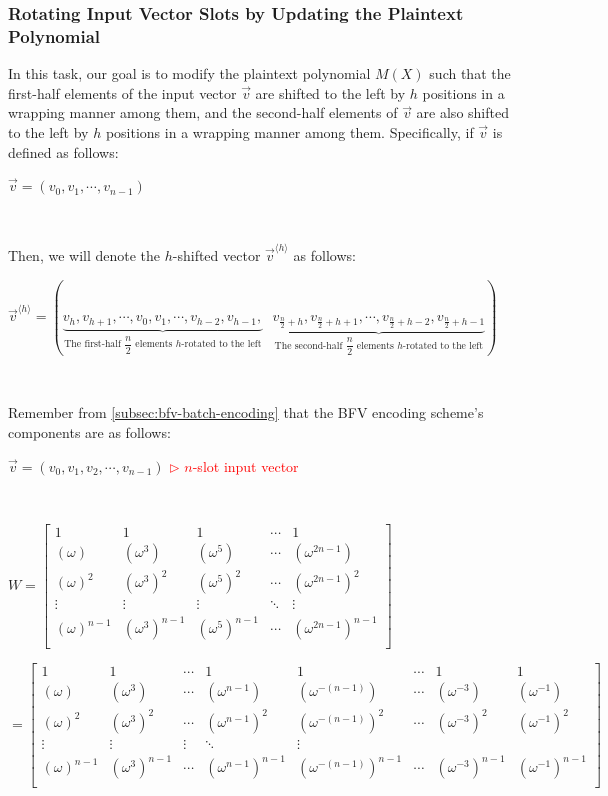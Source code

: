 \subsubsection{Rotating Input Vector Slots by Updating the Plaintext Polynomial}

In this task, our goal is to modify the plaintext polynomial $M(X)$ such that the first-half elements of the input vector $\vec{v}$ are shifted to the left by $h$ positions in a wrapping manner among them, and the second-half elements of $\vec{v}$ are also shifted to the left by $h$ positions in a wrapping manner among them. Specifically, if $\vec{v}$ is defined as follows:

$\vec{v} = (v_0, v_1, \cdots, v_{n-1})$

$ $

Then, we will denote the $h$-shifted vector $\vec{v}^{\langle h \rangle}$ as follows:  

$\vec{v}^{\langle h \rangle} = (\underbrace{v_h, v_{h+1}, \cdots, v_0, v_1, \cdots, v_{h-2}, v_{h-1},}_{\text{The first-half $\dfrac{n}{2}$ elements $h$-rotated to the left}} \text{ } \underbrace{v_{\frac{n}{2}+h}, v_{\frac{n}{2}+h+1}, \cdots, v_{\frac{n}{2}+h-2}, v_{\frac{n}{2}+h-1}}_{\text{The second-half $\dfrac{n}{2}$ elements $h$-rotated to the left}})$

$ $

Remember from \autoref{subsec:bfv-batch-encoding} that the BFV encoding scheme's components are as follows:

$\vec{v} = (v_0, v_1, v_2, \cdots, v_{n-1})$ \textcolor{red}{  $\rhd$ $n$-slot input vector}

$ $

$W =  \begin{bmatrix}
1 & 1 & 1 & \cdots & 1\\
(\omega) & (\omega^3) & (\omega^5) & \cdots & (\omega^{2n-1})\\
(\omega)^2 & (\omega^3)^2 & (\omega^5)^2 & \cdots & (\omega^{2n-1})^2\\
\vdots & \vdots & \vdots & \ddots & \vdots \\
(\omega)^{n-1} & (\omega^3)^{n-1} & (\omega^5)^{n-1} & \cdots & (\omega^{2n-1})^{n-1}\\
\end{bmatrix}$

$= \begin{bmatrix}
1 & 1 & \cdots & 1 & 1 & \cdots & 1 & 1\\
(\omega) & (\omega^3) & \cdots & (\omega^{n - 1}) & (\omega^{-(n - 1)}) & \cdots & (\omega^{-3}) & (\omega^{-1})\\
(\omega)^2 & (\omega^3)^2 & \cdots & (\omega^{n - 1})^2 & (\omega^{-(n - 1)})^2 & \cdots & (\omega^{-3})^2 & (\omega^{-1})^2\\
\vdots & \vdots & \vdots & \ddots & \vdots \\
(\omega)^{n-1} & (\omega^3)^{n-1} & \cdots & (\omega^{n - 1})^{n-1} & (\omega^{-(n - 1)})^{n-1} & \cdots & (\omega^{-3})^{n-1} & (\omega^{-1})^{n-1}\\
\end{bmatrix}$

